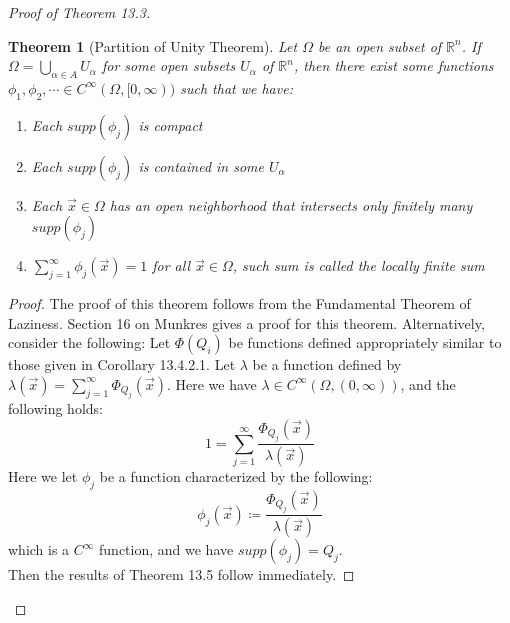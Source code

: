 \documentclass[15pt]{book}
\theoremstyle{break}
\theoremstyle{break}
\newtheorem{thm}{Theorem}[section]
\newcommand{\R}{\mathbb{R}}
\begin{document}
\begin{proof}[Proof of Theorem 13.3]
\newpage
\begin{thm}[Partition of Unity Theorem]
\setlength{\leftskip}{1cm}Let $\Omega$ be an open subset of $\R^n$. If $\Omega = \bigcup_{\alpha \in A} U_\alpha$ for some open subsets $U_\alpha$ of $\R^n$, then there exist some functions $\phi_1,\phi_2,\cdots \in C^\infty(\Omega, [0,\infty))$ such that we have:
\begin{enumerate}[topsep=3pt,itemsep=-1ex,partopsep=1ex,parsep=1ex,leftmargin=1.5cm]
\item Each $supp(\phi_j)$ is compact
\item Each $supp(\phi_j)$ is contained in some $U_\alpha$
\item Each $\vec{x}\in \Omega$  has an open neighborhood that intersects only finitely many $supp(\phi_j)$
\item $\sum_{j=1}^\infty \phi_j(\vec{x}) = 1$ for all $\vec{x}\in \Omega$, such sum is called the locally finite sum
\end{enumerate}
\end{thm}
\begin{proof}\setlength{\leftskip}{1cm}
The proof of this theorem follows from the Fundamental Theorem of Laziness. Section 16 on Munkres gives a proof for this theorem. Alternatively, consider the following:
Let $\Phi(Q_i)$ be functions defined appropriately similar to those given in Corollary 13.4.2.1. Let $\lambda$ be a function defined by $\lambda(\vec{x}) = \sum_{j=1}^\infty \Phi_{Q_j}(\vec{x})$. Here we have $\lambda \in C^\infty(\Omega,(0,\infty))$, and the following holds: $$1 = \sum_{j=1}^\infty \frac{\Phi_{Q_j}(\vec{x})}{\lambda(\vec{x})} $$ 
Here we let $\phi_j$ be a function characterized by the following: 
$$\phi_j(\vec{x}) \coloneqq \frac{\Phi_{Q_j}(\vec{x})}{\lambda(\vec{x})}$$ 
which is a $C^\infty$ function, and we have $supp(\phi_j) =Q_j$. \\
Then the results of Theorem 13.5 follow immediately. 
\end{proof}


\end{proof}
\end{document}

